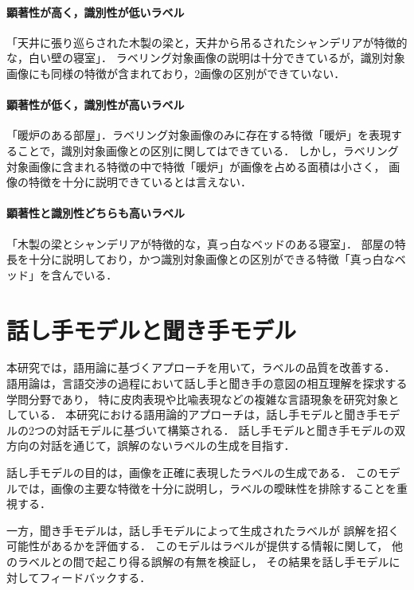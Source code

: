 \documentclass[a4paper,11pt]{jreport}
\begin{document}
\paragraph*{顕著性が高く，識別性が低いラベル}
「天井に張り巡らされた木製の梁と，天井から吊るされたシャンデリアが特徴的な，白い壁の寝室」．
ラベリング対象画像の説明は十分できているが，識別対象画像にも同様の特徴が含まれており，2画像の区別ができていない．
\paragraph*{顕著性が低く，識別性が高いラベル}
「暖炉のある部屋」．ラベリング対象画像のみに存在する特徴「暖炉」を表現することで，識別対象画像との区別に関してはできている．
しかし，ラベリング対象画像に含まれる特徴の中で特徴「暖炉」が画像を占める面積は小さく，
画像の特徴を十分に説明できているとは言えない．
\paragraph*{顕著性と識別性どちらも高いラベル}
「木製の梁とシャンデリアが特徴的な，真っ白なベッドのある寝室」．
部屋の特長を十分に説明しており，かつ識別対象画像との区別ができる特徴「真っ白なベッド」を含んでいる．

\section{話し手モデルと聞き手モデル}

本研究では，語用論に基づくアプローチを用いて，ラベルの品質を改善する．
語用論は，言語交渉の過程において話し手と聞き手の意図の相互理解を探求する学問分野であり，
特に皮肉表現や比喩表現などの複雑な言語現象を研究対象としている．
本研究における語用論的アプローチは，話し手モデルと聞き手モデルの2つの対話モデルに基づいて構築される．
話し手モデルと聞き手モデルの双方向の対話を通じて，誤解のないラベルの生成を目指す．

話し手モデルの目的は，画像を正確に表現したラベルの生成である．
このモデルでは，画像の主要な特徴を十分に説明し，ラベルの曖昧性を排除することを重視する．

一方，聞き手モデルは，話し手モデルによって生成されたラベルが
誤解を招く可能性があるかを評価する．
このモデルはラベルが提供する情報に関して，
他のラベルとの間で起こり得る誤解の有無を検証し，
その結果を話し手モデルに対してフィードバックする．

\end{document}
